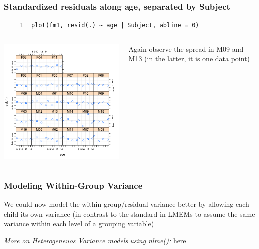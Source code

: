 \documentclass{beamer}
\begin{document}
\begin{frame}[fragile]
    \frametitle{Standardized residuals along age, separated by Subject}
    \scriptsize\begin{Verbatim}[numbers=left,numbersep=6pt,frame=single]
plot(fm1, resid(.) ~ age | Subject, abline = 0)
    \end{Verbatim}
    \begin{columns}
        \begin{column}{0.6\textwidth}
            \includegraphics[width=\textwidth]{lectures/day_7_diagnostics_of_mems/figures/unnamed-chunk-38-1.png}
        \end{column}
        \begin{column}{0.4\textwidth}
        \normalsize
            Again observe the spread in M09 and M13 (in the latter, it is one data point)
        \end{column}
    \end{columns}
\end{frame}

\begin{frame}
    \frametitle{Modeling Within-Group Variance}
    \large
    We could now model the within-group/residual variance better by allowing each child its own variance (in contrast to the standard in LMEMs to assume the same variance within each level of a grouping variable)
    \vspace{0.5cm}
    
    \textit{More on Heterogeneuos Variance models using nlme():} \color{blue}\href{https://quantdev.ssri.psu.edu/sites/qdev/files/ILD_Ch06_2017_MLMwithHeterogeneousVariance.html}{here}
\end{frame}
\end{document}
